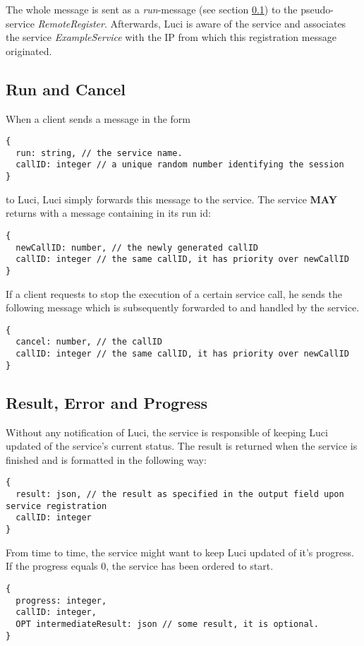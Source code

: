 The whole message is sent as a \emph{run}-message (see section \ref{sec:runandcancel}) to the pseudo-service \emph{RemoteRegister}. Afterwards, Luci is aware of the service and associates the service \emph{ExampleService} with the IP from which this registration message originated.

\subsection{Run and Cancel}\label{sec:runandcancel}
When a client sends a message in the form
\begin{lstlisting}
{
  run: string, // the service name.
  callID: integer // a unique random number identifying the session
}
\end{lstlisting}
to Luci, Luci simply forwards this message to the service. The service \textbf{MAY} returns with a message containing in its run id:
\begin{lstlisting}
{
  newCallID: number, // the newly generated callID
  callID: integer // the same callID, it has priority over newCallID
}
\end{lstlisting}
If a client requests to stop the execution of a certain service call, he sends the following message which is subsequently forwarded to and handled by the service.
\begin{lstlisting}
{
  cancel: number, // the callID
  callID: integer // the same callID, it has priority over newCallID
}
\end{lstlisting}


\subsection{Result, Error and Progress}
Without any notification of Luci, the service is responsible of keeping Luci updated of the service's current status. The result is returned when the service is finished and is formatted in the following way:

\begin{lstlisting}
{
  result: json, // the result as specified in the output field upon service registration
  callID: integer
}
\end{lstlisting}

From time to time, the service might want to keep Luci updated of it's progress. If the progress equals 0, the service has been ordered to start.
\begin{lstlisting}
{
  progress: integer,
  callID: integer,
  OPT intermediateResult: json // some result, it is optional.
}
\end{lstlisting}

